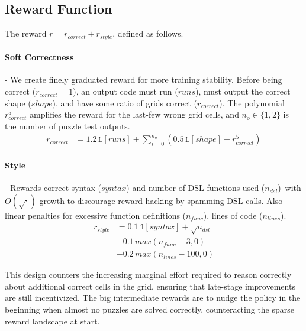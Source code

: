 \documentclass{article}
\begin{document}
\subsection{Reward Function}

The reward $r = r_{correct} + r_{style}$, defined as follows.
\paragraph{Soft Correctness} - We create finely graduated reward for more training stability. Before being correct ($r_{correct} = 1$), an output code must run ($runs$), must output the correct shape ($shape$), and have some ratio of grids correct ($r_{correct}$). The polynomial $r_{correct}^{5}$ amplifies the reward for the last-few wrong grid cells, and $n_o \in \{1,2\}$ is the number of puzzle test outputs.
$$
  \begin{aligned}
    r_{correct} & = 1.2\, \mathds{1} [runs] + \sum_{i=0}^{n_o} \left( 0.5\, \mathds{1} [shape] + r_{correct}^{5} \right)
  \end{aligned}
$$
\paragraph{Style} - Rewards correct syntax ($syntax$) and number of DSL functions used ($n_{dsl}$)--with $O(\sqrt{\cdot})$ growth to discourage reward hacking by spamming DSL calls. Also linear penalties for excessive function definitions ($n_{func}$), lines of code ($n_{lines}$).
$$
  \begin{aligned}
    r_{style} & = 0.1 \,\mathds{1} [syntax] + \sqrt{n_{dsl}} \\ &- 0.1 \, max(n_{func} - 3, 0) \\ &- 0.2 \, max(n_{lines} - 100, 0)
  \end{aligned}
$$

This design counters the increasing marginal effort required to reason correctly about additional correct cells in the grid, ensuring that late-stage improvements are still incentivized. The big intermediate rewards are to nudge the policy in the beginning when almost no puzzles are solved correctly, counteracting the sparse reward landscape at start.
\end{document}

